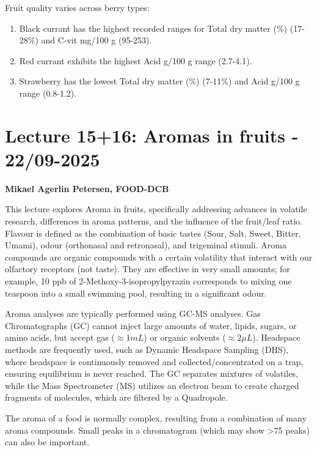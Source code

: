 \vspace{0.5em}
Fruit quality varies across berry types: 

\begin{enumerate} 
    \item Black currant has the highest recorded ranges for Total dry matter (\%) (17-28\%) and C-vit mg/100 g (95-253). 
    \item Red currant exhibits the highest Acid g/100 g range (2.7-4.1). 
    \item Strawberry has the lowest Total dry matter (\%) (7-11\%) and Acid g/100 g range (0.8-1.2). 
\end{enumerate}


\section{Lecture 15+16: Aromas in fruits - 22/09-2025}
\textbf{Mikael Agerlin Petersen, FOOD-DCB}

\vspace{1em}
This lecture explores Aroma in fruits, specifically addressing advances in volatile research, differences in aroma patterns, and the influence of the fruit/leaf ratio. Flavour is defined as the combination of basic tastes (Sour, Salt, Sweet, Bitter, Umami), odour (orthonasal and retronasal), and trigeminal stimuli. Aroma compounds are organic compounds with a certain volatility that interact with our olfactory receptors (not taste). They are effective in very small amounts; for example, 10 ppb of 2-Methoxy-3-isopropylpyrazin corresponds to mixing one teaspoon into a small swimming pool, resulting in a significant odour.

\vspace{0.5em}
Aroma analyses are typically performed using GC-MS analyses. Gas Chromatographs (GC) cannot inject large amounts of water, lipids, sugars, or amino acids, but accept gas ($\approx 1 mL$) or organic solvents ($\approx 2 \mu L$). Headspace methods are frequently used, such as Dynamic Headspace Sampling (DHS), where headspace is continuously removed and collected/concentrated on a trap, ensuring equilibrium is never reached. The GC separates mixtures of volatiles, while the Mass Spectrometer (MS) utilizes an electron beam to create charged fragments of molecules, which are filtered by a Quadropole.

\vspace{0.5em}
The aroma of a food is normally complex, resulting from a combination of many aroma compounds. Small peaks in a chromatogram (which may show >75 peaks) can also be important. 

